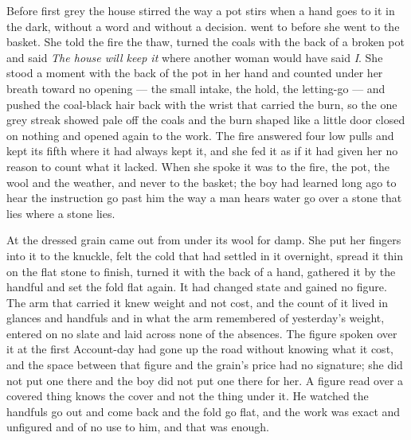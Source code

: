 \scenebreak

Before first grey the house stirred the way a pot stirs when a hand goes to it in the dark, without a word and without a decision.  went to  before she went to the basket. She told the fire the thaw, turned the coals with the back of a broken pot and said \emph{The house will keep it} where another woman would have said \emph{I}. She stood a moment with the back of the pot in her hand and counted under her breath toward no opening --- the small intake, the hold, the letting-go --- and pushed the coal-black hair back with the wrist that carried the burn, so the one grey streak showed pale off the coals and the burn shaped like a little door closed on nothing and opened again to the work. The fire answered four low pulls and kept its fifth where it had always kept it, and she fed it as if it had given her no reason to count what it lacked. When she spoke it was to the fire, the pot, the wool and the weather, and never to the basket; the boy had learned long ago to hear the instruction go past him the way a man hears water go over a stone that lies where a stone lies.

At  the dressed grain came out from under its wool for damp. She put her fingers into it to the knuckle, felt the cold that had settled in it overnight, spread it thin on the flat stone to finish, turned it with the back of a hand, gathered it by the handful and set the fold flat again. It had changed state and gained no figure. The arm that carried it knew weight and not cost, and the count of it lived in glances and handfuls and in what the arm remembered of yesterday's weight, entered on no slate and laid across none of the absences. The figure spoken over it at the first Account-day had gone up the road without knowing what it cost, and the space between that figure and the grain's price had no signature; she did not put one there and the boy did not put one there for her. A figure read over a covered thing knows the cover and not the thing under it. He watched the handfuls go out and come back and the fold go flat, and the work was exact and unfigured and of no use to him, and that was enough.

